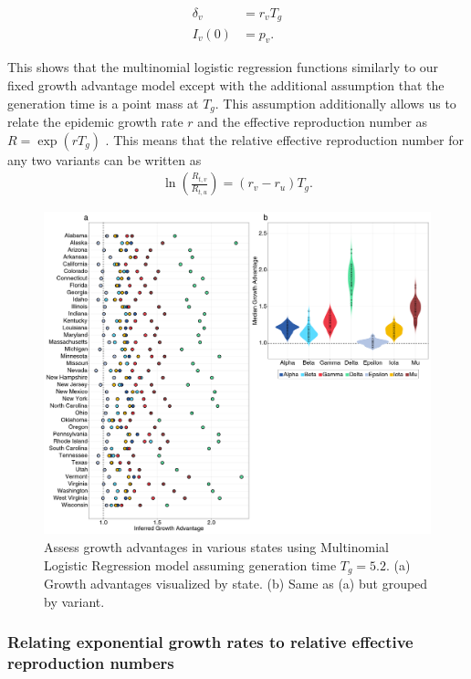 \documentclass[11pt,oneside,letterpaper]{article}
\begin{document}
\begin{align}
  \delta_{v} &= r_{v}T_{g}\\
  I_{v}(0) &= p_{v}.
\end{align}

This shows that the multinomial logistic regression functions similarly to our fixed growth advantage model except with the additional assumption that the generation time is a point mass at $T_{g}$.
This assumption additionally allows us to relate the epidemic growth rate $r$ and the effective reproduction number as $R = \exp(r T_{g})$ \cite{Wallinga2006}. This means that the relative effective reproduction number for any two variants can be written as
\begin{align*}
\ln \left( \frac{R_{t,v}}{R_{t,u}} \right) = (r_{v} - r_{u}) T_{g}.
\end{align*}

\begin{figure}
  \centering
  \includegraphics[width=\linewidth]{figs/fig_MLR_growth_advantages_supp.png}
  \caption{Assess growth advantages in various states using Multinomial Logistic Regression model assuming generation time $T_{g} = 5.2$.
  (a) Growth advantages visualized by state.
  (b) Same as (a) but grouped by variant.}%
  \label{fig:MLR_growth_advantages}
\end{figure}

\newpage

\subsubsection*{Relating exponential growth rates to relative effective reproduction numbers}
\end{document}
